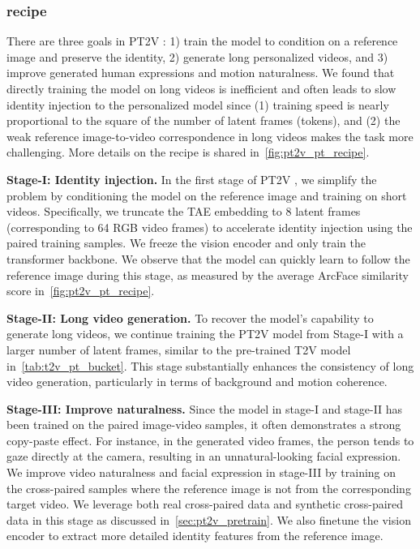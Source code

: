 \subsubsection{\Pretraining recipe}
\label{subsec:pt2v_recipe}
 There are three goals in PT2V \pretraining: 1) train the model to condition on a reference image and preserve the identity, 2) generate long personalized videos, and 3) improve generated human expressions and motion naturalness. We found that directly training the model on long videos is inefficient and often leads to slow identity injection to the personalized model since  (1) training speed is nearly proportional to the square of the number of latent frames (tokens), and (2) the weak reference image-to-video correspondence in long videos makes the task more challenging.
 More details on the \pretraining recipe is shared in~\cref{fig:pt2v_pt_recipe}.


\noindent \textbf{Stage-I: Identity injection.}
In the first stage of PT2V \pretraining, we simplify the problem by conditioning the model on the reference image and training on short videos.
Specifically, we truncate the TAE embedding to 8 latent frames (corresponding to 64 RGB video frames) to accelerate identity injection using the paired training samples. We freeze the vision encoder and only train the transformer backbone.
We observe that the model can quickly learn to follow the reference image during this stage, as measured by the average ArcFace similarity score in~\cref{fig:pt2v_pt_recipe}.


\noindent \textbf{Stage-II: Long video generation.}
To recover the model's capability to generate long videos, we continue training the PT2V model from Stage-I with a larger number of latent frames, similar to the pre-trained T2V model in~\cref{tab:t2v_pt_bucket}. This stage substantially enhances the consistency of long video generation, particularly in terms of background and motion coherence.


\noindent \textbf{Stage-III: Improve naturalness.} Since the model in stage-I and stage-II has been trained on the paired image-video samples, it often demonstrates a strong copy-paste effect. For instance, in the generated video frames, the person tends to gaze directly at the camera, resulting in an unnatural-looking facial expression. We improve video naturalness and facial expression in stage-III by training on the cross-paired samples where the reference image is not from the corresponding target video. We leverage both real cross-paired data and synthetic cross-paired data in this stage as discussed in~\cref{sec:pt2v_pretrain}.
We also finetune the vision encoder to extract more detailed identity features from the reference image.


